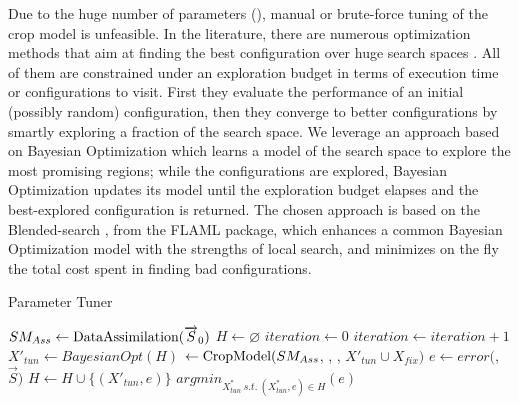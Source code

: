 Due to the huge number of parameters (), manual or brute-force tuning of the crop model is unfeasible.
In the literature, there are numerous optimization methods that aim at finding the best configuration over huge search spaces \cite{luo2017automating}.
All of them are constrained under an exploration budget in terms of execution time or configurations to visit.
First they evaluate the performance of an initial (possibly random) configuration, then they converge to better configurations by smartly exploring a fraction of the search space.
We leverage an approach based on Bayesian Optimization \cite{frazier2018tutorial} which learns a model of the search space to explore the most promising regions; while the configurations are explored, Bayesian Optimization updates its model until the exploration budget elapses and the best-explored configuration is returned.
The chosen approach is based on the Blended-search \cite{wang2021flaml}, from the FLAML package, which enhances a common Bayesian Optimization model with the strengths of local search, and minimizes on the fly the total cost spent in finding bad configurations.

\begin{algorithm}[t]
\caption{Parameter Tuner}
\footnotesize
\begin{algorithmic}[1]
    \State $SM_{Ass} \gets \textup{DataAssimilation}(\overrightarrow{S}_{0})$ 
    \State $H \gets \varnothing$ 
    \State $iteration \gets 0$ 
     
        \State $iteration \gets iteration + 1$ 
        \State $X'_{tun} \gets BayesianOpt(H)$ 
        \State \SMt $\gets \textup{CropModel}(SM_{Ass}$, \Wt, \It, $X'_{tun} \cup X_{fix})$ 
        \State $e \gets error($\SMt, $\overrightarrow{S})$ 
        \State $H \gets H \cup \{(X'_{tun}, e)\}$ 
    \EndWhile
    \State \Return $argmin_{X^*_{tun}~s.t.~(X^*_{tun}, e) \in H}{(e)}$ 
\end{algorithmic}
\label{alg:bayesian-optimization}
\end{algorithm}


